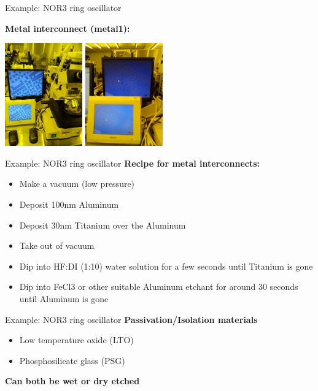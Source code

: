 \documentclass[aspectratio=169]{beamer}
\begin{document}
\begin{frame}{Example: NOR3 ring oscillator}
\begin{center}
	\textbf{Metal interconnect (metal1):}

	\includegraphics[width=0.25\textwidth]{images/20181218_115931.jpg}
	\includegraphics[width=0.25\textwidth]{images/20181218_161016.jpg}
\end{center}
\end{frame}

\begin{frame}{Example: NOR3 ring oscillator}
	\textbf{Recipe for metal interconnects:}

	\begin{itemize}
		\item Make a vacuum (low pressure)
		\item Deposit 100nm Aluminum
		\item Deposit 30nm Titanium over the Aluminum
		\item Take out of vacuum
		\item Dip into HF:DI (1:10) water solution for a few seconds until Titanium is gone
		\item Dip into FeCl3 or other suitable Aluminum etchant for around 30 seconds until Aluminum is gone
	\end{itemize}
\end{frame}

\begin{frame}{Example: NOR3 ring oscillator}
	\textbf{Passivation/Isolation materials}

	\begin{itemize}
		\item Low temperature oxide (LTO)
		\item Phosphosilicate glass (PSG)
	\end{itemize}
	
	\textbf{Can both be wet or dry etched}
\end{frame}
\end{document}
